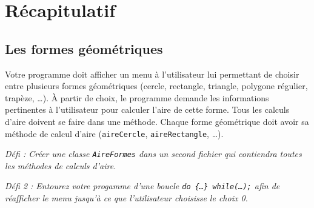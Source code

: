 \documentclass[12pt]{article}
\begin{document}
\section{Récapitulatif}

\subsection{Les formes géométriques}

Votre programme doit afficher un menu à l'utilisateur lui permettant de choisir entre plusieurs formes géométriques (cercle, rectangle, triangle, polygone régulier, trapèze, \dots). À partir de choix, le programme demande les informations pertinentes à l'utilisateur pour calculer l'aire de cette forme. Tous les calculs d'aire doivent se faire dans une méthode. Chaque forme géométrique doit avoir sa méthode de calcul d'aire (\texttt{aireCercle}, \texttt{aireRectangle}, \dots). 

\textit{Défi : Créer une classe \texttt{AireFormes} dans un second fichier qui contiendra toutes les méthodes de calculs d'aire.}

\textit{Défi 2 : Entourez votre progamme d'une boucle \texttt{do \{\dots \} while(\dots);} afin de réafficher le menu jusqu'à ce que l'utilisateur choisisse le choix 0.}
\end{document}

